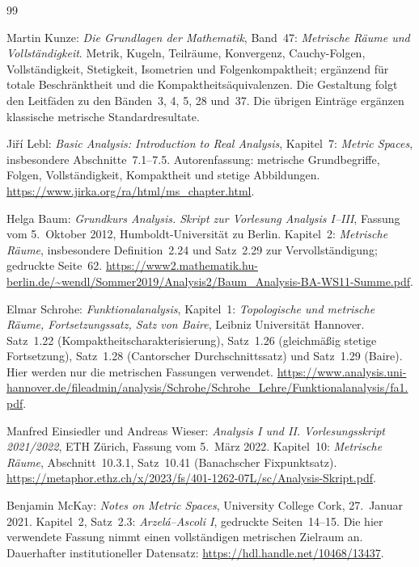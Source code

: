 \renewcommand{\bibname}{Quellen und Bandzuordnung}
\begin{thebibliography}{99}
\footnotesize
\setlength{\itemsep}{6pt}
\setlength{\parskip}{0pt}

Martin Kunze: \emph{Die Grundlagen der Mathematik}, Band~47:
\emph{Metrische Räume und Vollständigkeit}.
Metrik, Kugeln, Teilräume, Konvergenz, Cauchy-Folgen, Vollständigkeit,
Stetigkeit, Isometrien und Folgenkompaktheit; ergänzend
 für totale Beschränktheit
und die Kompaktheitsäquivalenzen.
Die Gestaltung folgt den Leitfäden zu den Bänden~3, 4, 5, 28 und~37.
Die übrigen Einträge ergänzen klassische metrische Standardresultate.

Jiří Lebl: \emph{Basic Analysis: Introduction to Real Analysis},
Kapitel~7: \emph{Metric Spaces}, insbesondere Abschnitte~7.1--7.5.
Autorenfassung: metrische Grundbegriffe, Folgen, Vollständigkeit,
Kompaktheit und stetige Abbildungen.
\url{https://www.jirka.org/ra/html/ms_chapter.html}.

Helga Baum: \emph{Grundkurs Analysis. Skript zur Vorlesung Analysis I--III},
Fassung vom 5.~Oktober 2012, Humboldt-Universität zu Berlin.
Kapitel~2: \emph{Metrische Räume}, insbesondere Definition~2.24 und
Satz~2.29 zur Vervollständigung; gedruckte Seite~62.
\url{https://www2.mathematik.hu-berlin.de/~wendl/Sommer2019/Analysis2/Baum_Analysis-BA-WS11-Summe.pdf}.

Elmar Schrohe: \emph{Funktionalanalysis}, Kapitel~1:
\emph{Topologische und metrische Räume, Fortsetzungssatz, Satz von Baire},
Leibniz Universität Hannover.
Satz~1.22 (Kompaktheitscharakterisierung), Satz~1.26 (gleichmäßig stetige
Fortsetzung), Satz~1.28 (Cantorscher Durchschnittssatz) und Satz~1.29
(Baire). Hier werden nur die metrischen Fassungen verwendet.
\url{https://www.analysis.uni-hannover.de/fileadmin/analysis/Schrohe/Schrohe_Lehre/Funktionalanalysis/fa1.pdf}.

Manfred Einsiedler und Andreas Wieser:
\emph{Analysis I und II. Vorlesungsskript 2021/2022},
ETH Zürich, Fassung vom 5.~März 2022.
Kapitel~10: \emph{Metrische Räume}, Abschnitt~10.3.1,
Satz~10.41 (Banachscher Fixpunktsatz).
\url{https://metaphor.ethz.ch/x/2023/fs/401-1262-07L/sc/Analysis-Skript.pdf}.

Benjamin McKay: \emph{Notes on Metric Spaces},
University College Cork, 27.~Januar 2021.
Kapitel~2, Satz~2.3: \emph{Arzelá--Ascoli I}, gedruckte Seiten~14--15.
Die hier verwendete Fassung nimmt einen vollständigen metrischen
Zielraum an. Dauerhafter institutioneller Datensatz:
\url{https://hdl.handle.net/10468/13437}.


\end{thebibliography}
